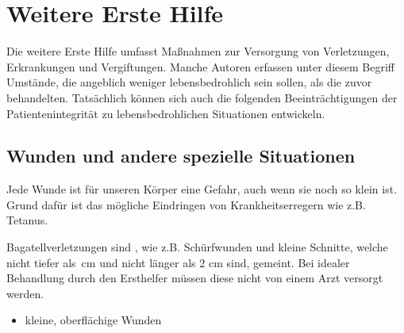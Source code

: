 \section{Weitere Erste Hilfe}

Die weitere Erste Hilfe umfasst Maßnahmen zur Versorgung von
Verletzungen, Erkrankungen und Vergiftungen. Manche Autoren erfassen
unter diesem Begriff Umstände, die
angeblich weniger lebensbedrohlich sein sollen, als die zuvor behandelten. Tatsächlich
können sich auch die folgenden Beeinträchtigungen der
Patientenintegrität zu lebensbedrohlichen Situationen entwickeln. 



\subsection{Wunden und andere spezielle Situationen}
\label{topic:ehi-wunden}


Jede Wunde ist für unseren Körper eine Gefahr, auch wenn sie noch so klein
ist. Grund dafür ist das mögliche Eindringen von Krankheitserregern wie z.B.
Tetanus. 

{
Bagatellverletzungen sind , wie z.B.
Schürfwunden und kleine Schnitte, welche nicht tiefer als \,cm
und nicht länger als 2 cm sind, gemeint. Bei idealer Behandlung durch
den Ersthelfer müssen diese nicht von einem Arzt versorgt
werden. 
}{
\begin {itemize}
    \item kleine, oberflächige Wunden
\end{itemize}
}{}{}{}


